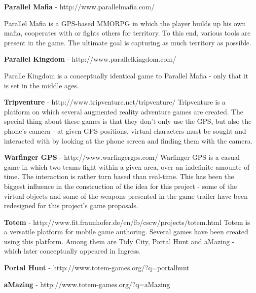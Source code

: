 \documentclass{article}
\begin{document}
\textbf{Parallel Mafia} - http://www.parallelmafia.com/ \newline

Parallel Mafia is a GPS-based MMORPG in which the player builds up his own
mafia, cooperates with or fights others for territory. To this end, various tools
are present in the game. The ultimate goal is capturing as much territory as
possible.\newline

\textbf{Parallel Kingdom} - http://www.parallelkingdom.com/ \newline

Paralle Kingdom is a conceptually identical game to Parallel Mafia - only that
it is set in the middle ages.\newline

\textbf{Tripventure} - http://www.tripventure.net/tripventure/ \newline
Tripventure is a platform on which several augmented reality adventure games are
created. The special thing about these games is that they don't only use the
GPS, but also the phone's camera - at given GPS positions, virtual characters
must be sought and interacted with by looking at the phone screen and finding
them with the camera.\newline


\textbf{Warfinger GPS} - http://www.warfingergps.com/ \newline
Warfinger GPS is a casual game in which two teams fight within a given area,
over an indefinite amounte of time. The interaction is rather turn based than
real-time. This has been the biggest influence in the construction of the idea
for this project - some of the virtual objects and some of the weapons presented
in the game trailer have been redesigned for this project's game
proposals.\newline

\textbf{Totem} - http://www.fit.fraunhofer.de/en/fb/cscw/projects/totem.html
\newline
Totem is a versatile platform for mobile game authoring. Several games have been
created using this platform. Among them are Tidy City, Portal Hunt and aMazing -
which later conceptually appeared in Ingress.\newline

\textbf{Portal Hunt} - http://www.totem-games.org/?q=portalhunt \newline

\textbf{aMazing} - http://www.totem-games.org/?q=aMazing \newline
\end{document}
